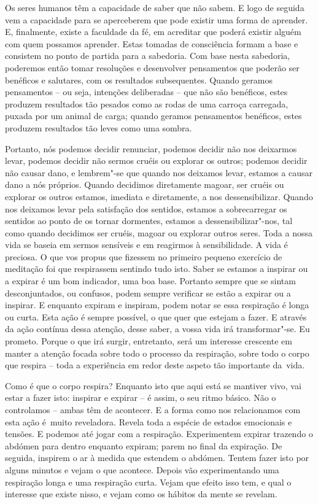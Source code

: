 Os seres humanos têm a capacidade de saber que não sabem. E logo de seguida vem
a capacidade para se aperceberem que pode existir uma forma de aprender. E,
finalmente, existe a faculdade da fé, em acreditar que poderá existir alguém com
quem possamos aprender. Estas tomadas de consciência formam a base e consistem
no ponto de partida para a sabedoria. Com base nesta sabedoria, poderemos então
tomar resoluções e desenvolver pensamentos que poderão ser benéficos e
salutares, com os resultados subsequentes. Quando geramos pensamentos -- ou
seja, intenções deliberadas -- que não são benéficos, estes produzem resultados
tão pesados como as rodas de uma carroça carregada, puxada por um animal de
carga; quando geramos pensamentos benéficos, estes produzem resultados tão leves
como uma sombra.

Portanto, nós podemos decidir renunciar, podemos decidir não nos deixarmos levar,
podemos decidir não sermos cruéis ou explorar os outros; podemos decidir não
causar dano, e lembrem"-se que quando nos deixamos levar, estamos a causar dano a
nós próprios. Quando decidimos diretamente magoar, ser cruéis ou explorar os
outros estamos, imediata e diretamente, a nos dessensibilizar. Quando nos
deixamos levar pela satisfação dos sentidos, estamos a sobrecarregar os sentidos
ao ponto de os tornar dormentes, estamos a dessensibilizar"-nos, tal como
quando decidimos ser cruéis, magoar ou explorar outros seres. Toda a nossa vida
se baseia em sermos sensíveis e em reagirmos à sensibilidade. A vida é preciosa.
O que vos propus que fizessem no primeiro pequeno exercício de meditação foi que
respirassem sentindo tudo isto. Saber se estamos a inspirar ou a expirar é um
bom indicador, uma boa base. Portanto sempre que se sintam desconjuntados, ou
confusos, podem sempre verificar se estão a expirar ou a inspirar. E enquanto
expiram e inspiram, podem notar se essa respiração é longa ou curta. Esta ação é
sempre possível, o que quer que estejam a fazer. E através da ação contínua
dessa atenção, desse saber, a vossa vida irá transformar"-se. Eu prometo. Porque
o que irá surgir, entretanto, será um interesse crescente em manter a atenção
focada sobre todo o processo da respiração, sobre todo o corpo que respira --
toda a experiência em redor deste aspeto tão importante da~vida.

\enlargethispage{\baselineskip}

Como é que o corpo respira? Enquanto isto que aqui está se mantiver vivo, vai
estar a fazer isto: inspirar e expirar -- é assim, o seu ritmo básico. Não o
controlamos -- ambas têm de acontecer. E a forma como nos relacionamos com esta
ação é~muito reveladora. Revela toda a espécie de estados emocionais e tensões.
E podemos até jogar com a respiração. Experimentem expirar trazendo o abdómen
para dentro enquanto expiram; parem no final da expiração. De seguida, inspirem
o ar à medida que estendem o abdómen. Tentem fazer isto por alguns minutos e
vejam o que acontece. Depois vão experimentando uma respiração longa e uma
respiração curta. Vejam que efeito isso tem, e qual o interesse que existe
nisso, e vejam como os hábitos da mente se revelam.

